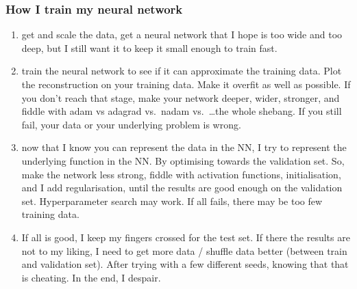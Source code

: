 \documentclass[USenglish,pdftex,compress,10pt,svgnamesi,handout]{beamer}
\begin{document}
\begin{frame}
\frametitle{How I train my neural network}
\begin{enumerate}
\item get and scale the data, get a neural network that I hope is too wide and too deep, but I still want it to keep it small enough to train fast.
\item train the neural network to see if it can approximate the training data.  Plot the reconstruction on your training data.  Make it overfit as well as possible.  If you don't reach that stage, make your network deeper, wider, stronger, and fiddle with adam vs adagrad vs.\ nadam vs.\ \dots the whole shebang.  If you still fail, your data or your underlying problem is wrong.
\item now that I know you can represent the data in the NN, I try to represent the underlying function in the NN.  By optimising towards the validation set.  So, make the network less strong, fiddle with activation functions, initialisation, and I add regularisation, until the results are good enough on the validation set.  Hyperparameter search may work.  If all fails, there may be too few training data.
\item If all is good, I keep my fingers crossed for the test set.  If there the results are not to my liking, I need to get more data / shuffle data better (between train and validation set).  After trying with a few different seeds, knowing that that is cheating.  In the end, I despair.
\end{enumerate}
\end{frame}
\end{document}
